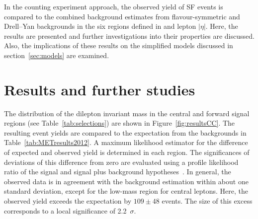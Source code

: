\label{sec:counting}
In the counting experiment approach, the observed yield of SF events is compared to the combined background estimates from flavour-symmetric and Drell--Yan backgrounds in the six regions defined in \mll and lepton $|\eta|$. Here, the results are presented and further investigations into their properties are discussed. Also, the implications of these results on the  simplified models discussed in section~\ref{sec:models} are examined.  
\section{Results and further studies}

\label{sec:candcresults}
The distribution of the dilepton invariant mass in the central and forward signal regions (see Table~\ref{tab:selections}) are shown in Figure~\ref{fig:resultsCC}. The resulting event yields are compared to the expectation from the backgrounds in Table~\ref{tab:METresults2012}. A maximum likelihood estimator for the difference of expected and observed yield is determined in each region. The significances of deviations of this difference from zero are evaluated using a profile likelihood ratio of the signal and signal plus background hypotheses~\cite{HiggsTool1}. In general, the observed data is in agreement with the background estimation within about one standard deviation, except for the low-mass region for central leptons. Here, the observed yield exceeds the expectation by $109\pm48$ events. The size of this excess corresponds to a local significance of 2.2~$\sigma$.  

